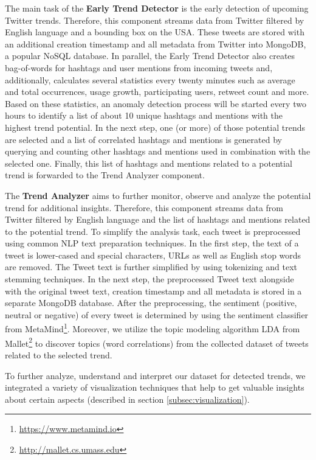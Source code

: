 The main task of the \textbf{Early Trend Detector} is the early detection of upcoming Twitter trends. Therefore, this component streams data from Twitter filtered by English language and a bounding box on the USA. These tweets are stored with an additional creation timestamp and all metadata from Twitter into MongoDB, a popular NoSQL database. In parallel, the Early Trend Detector also creates bag-of-words for hashtags and user mentions from incoming tweets and, additionally, calculates several statistics every twenty minutes such as average and total occurrences, usage growth, participating users, retweet count and more. Based on these statistics, an anomaly detection process will be started every two hours to identify a list of about 10 unique hashtags and mentions with the highest trend potential. In the next step, one (or more) of those potential trends are selected and a list of correlated hashtags and mentions is generated by querying and counting other hashtags and mentions used in combination with the selected one. Finally, this list of hashtags and mentions related to a potential trend is forwarded to the Trend Analyzer component.

The \textbf{Trend Analyzer} aims to further monitor, observe and analyze the potential trend for additional insights. Therefore, this component streams data from Twitter filtered by English language and the list of hashtags and mentions related to the potential trend. To simplify the analysis task, each tweet is preprocessed using common NLP text preparation techniques. In the first step, the text of a tweet is lower-cased and special characters, URLs as well as English stop words are removed. The Tweet text is further simplified by using tokenizing and text stemming techniques. In the next step, the preprocessed Tweet text alongside with the original tweet text, creation timestamp and all metadata is stored in a separate MongoDB database. After the preprocessing, the sentiment (positive, neutral or negative) of every tweet is determined by using the sentiment classifier from MetaMind\footnote{\url{https://www.metamind.io} \accessednote}. Moreover, we utilize the topic modeling algorithm LDA from Mallet\footnote{\url{http://mallet.cs.umass.edu} \accessednote} to discover topics (word correlations) from the collected dataset of tweets related to the selected trend. 

To further analyze, understand and interpret our dataset for detected trends, we integrated a variety of visualization techniques that help to get valuable insights about certain aspects (described in section \ref{subsec:visualization}). 